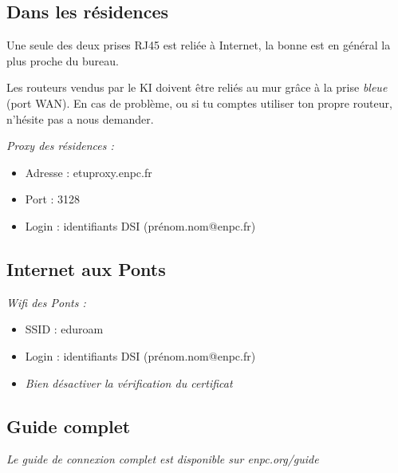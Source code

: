 \documentclass{../templates/enpc-ki/ki020}
\begin{document}
    \begin{kiframe}
      \subsection{Dans les résidences} %
        Une seule des deux prises RJ45 est reliée à Internet, la bonne est en général la plus proche du bureau.

        Les routeurs vendus par le KI doivent être reliés au mur grâce à la prise \emph{bleue} (port WAN). En cas de problème, ou si tu comptes utiliser ton propre routeur, n'hésite pas a nous demander.

        \begin{flushleft}
          \emph{Proxy des résidences :}
          \begin{itemize}
            \item Adresse : etuproxy.enpc.fr
            \item Port : 3128
            \item Login : identifiants DSI (prénom.nom@enpc.fr)
          \end{itemize}
        \end{flushleft}

      \subsection{Internet aux Ponts}
        \begin{flushleft}
          \emph{Wifi des Ponts :}
          \begin{itemize}
            \item SSID : eduroam
            \item Login : identifiants DSI (prénom.nom@enpc.fr)
            \item \emph{Bien désactiver la vérification du certificat}
          \end{itemize}
        \end{flushleft}

\subsection{Guide complet}
  \begin{flushleft}
    \emph{Le guide de connexion complet est disponible sur enpc.org/guide}
  \end{flushleft}
      \end{kiframe}
\end{document}
